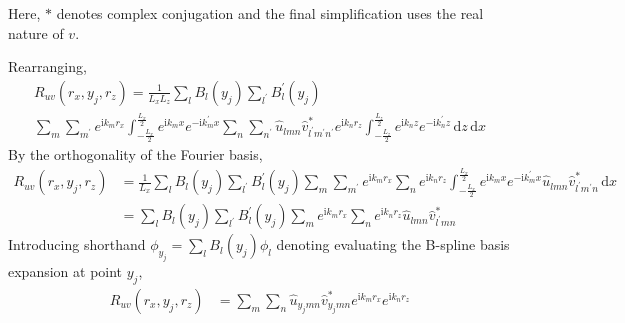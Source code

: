 \documentclass[letterpaper,11pt,nointlimits,reqno]{amsart}
\newcommand{\ii}{\ensuremath{\mathrm{i}}}
\begin{document}
Here, $\ast$ denotes complex conjugation and the final simplification uses the
real nature of $v$.


Rearranging,
\begin{multline}
R_{uv} \left( r_x, y_j, r_z \right)
   = \frac{1}{L_x L_z}
     \sum_{l} B_l\left(y_j\right)
     \sum_{l^\prime} B_l^\prime\left(y_j\right)
     \\
     \sum_{m}
     \sum_{m^\prime}
     e^{\ii k_m r_x}
     \int_{-\frac{L_x}{2}}^{\frac{L_x}{2}}
     e^{\ii k_m x  }
     e^{-\ii k_m^\prime x}
     \sum_{n}
     \sum_{n^\prime}
     \hat{u}_{l m n}
     \hat{v}^\ast_{l^\prime m^\prime n^\prime}
     e^{\ii k_n r_z}
     \int_{-\frac{L_z}{2}}^{\frac{L_z}{2}}
     e^{\ii k_n z  }
     e^{-\ii k_n^\prime z}
     \,\mathrm{d}z
     \,\mathrm{d}x
\end{multline}
By the orthogonality of the Fourier basis,
\begin{align}
R_{uv} \left( r_x, y_j, r_z \right)
  &= \frac{1}{L_x}
     \sum_{l} B_l\left(y_j\right)
     \sum_{l^\prime} B_l^\prime\left(y_j\right)
     \sum_{m}
     \sum_{m^\prime}
     e^{\ii k_m r_x}
     \sum_{n}
     e^{\ii k_n r_z}
     \int_{-\frac{L_x}{2}}^{\frac{L_x}{2}}
     e^{\ii k_m x  }
     e^{-\ii k_m^\prime x}
     \hat{u}_{l m n}
     \hat{v}^\ast_{l^\prime m^\prime n}
     \,\mathrm{d}x
\\
  &= \sum_{l} B_l\left(y_j\right)
     \sum_{l^\prime} B_l^\prime\left(y_j\right)
     \sum_{m}
     e^{\ii k_m r_x}
     \sum_{n}
     e^{\ii k_n r_z}
     \hat{u}_{l m n}
     \hat{v}^\ast_{l^\prime m n}
\end{align}
Introducing shorthand $\phi_{y_j} = \sum_{l} B_l\left(y_j\right) \phi_l$
denoting evaluating the B-spline basis expansion at point $y_j$,
\begin{align}
R_{uv} \left( r_x, y_j, r_z \right)
  &=
     \sum_{m}
     \sum_{n}
     \hat{u}_{y_j m n}
     \hat{v}^\ast_{y_j m n}
     e^{\ii k_m r_x}
     e^{\ii k_n r_z}
  \label{eq:twopoint_physical_xz}
\end{align}
\end{document}
